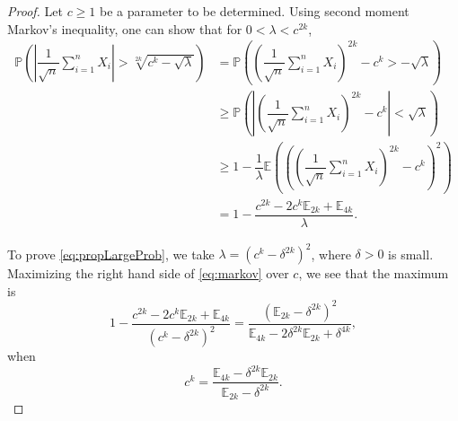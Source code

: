 \documentclass{amsart}
\theoremstyle{plain}
\theoremstyle{definition}
\newcommand{\EE}{\mathbb{E}}
\begin{document}
\begin{proof}
Let $c\geq1$ be a parameter to be determined. Using second moment Markov's inequality, one can show that for $0<\lambda<{c}^{2k}$,
\begin{equation}
\label{eq:markov}
\begin{split}
\mathbb{P}\left(\left|\dfrac{1}{\sqrt{n}}\sum_{i=1}^{n}X_i\right|>\sqrt[2k]{c^k-\sqrt{\lambda}}\right)
&=\mathbb{P}\left(\left(\dfrac{1}{\sqrt{n}}\sum_{i=1}^{n}X_i\right)^{2k}-c^{k}>-\sqrt{\lambda}\right)\\
&\geq\mathbb{P}\left(\left|\left(\dfrac{1}{\sqrt{n}}\sum_{i=1}^{n}X_i\right)^{2k}-c^k\right|<\sqrt\lambda\right)\\
&\geq1-\dfrac{1}{\lambda}\EE\left(\left(\left(\dfrac{1}{\sqrt{n}}\sum_{i=1}^{n}X_i\right)^{2k}-c^k\right)^2\right)\\
&=1-\dfrac{c^{2k}-2c^{k}\EE_{2k}+\EE_{4k}}{\lambda}.
\end{split}
\end{equation}

To prove \eqref{eq:propLargeProb}, we take $\lambda=(c^k-\delta^{2k})^{2}$, where $\delta>0$ is small. Maximizing the right hand side of \eqref{eq:markov} over $c$, we see that the maximum is
\[
1-\dfrac{c^{2k}-2c^{k}\EE_{2k}+\EE_{4k}}{(c^k-\delta^{2k})^2}=\dfrac{(\EE_{2k}-\delta^{2k})^2}{\EE_{4k}-2\delta^{2k}\EE_{2k}+\delta^{4k}},
\]
when
\[
c^k=\dfrac{\EE_{4k}-\delta^{2k}\EE_{2k}}{\EE_{2k}-\delta^{2k}}.
\]


\end{proof}
\end{document}
